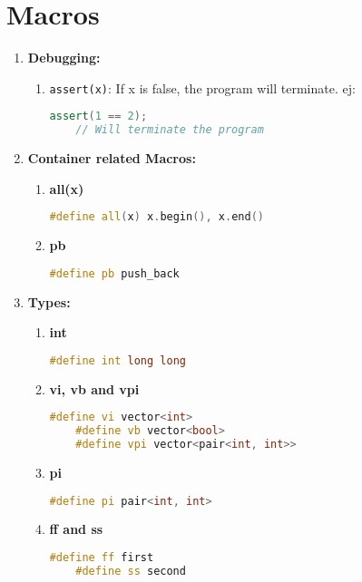 \section{Macros}
\begin{enumerate}
  \item \textbf{Debugging:}
    \begin{enumerate}
      \item \texttt{assert(x)}: If x is false, the program will terminate. ej:
	\begin{lstlisting}[language=C++]
	assert(1 == 2);
	// Will terminate the program
	\end{lstlisting}
    \end{enumerate}
  \item \textbf{Container related Macros:}
    \begin{enumerate}
      \item \textbf{all(x)}
	\begin{lstlisting}[language=C++]
	#define all(x) x.begin(), x.end()
	\end{lstlisting}
      \item \textbf{pb}
	\begin{lstlisting}[language=C++]
	#define pb push_back
	\end{lstlisting}
    \end{enumerate}
  \item \textbf{Types: }
    \begin{enumerate}
      \item \textbf{int}
	\begin{lstlisting}[language=C++]
	#define int long long
	\end{lstlisting}
      \item \textbf{vi, vb and vpi}
	\begin{lstlisting}[language=C++]
	#define vi vector<int>
	#define vb vector<bool>
	#define vpi vector<pair<int, int>>
	\end{lstlisting}
      \item \textbf{pi}
	\begin{lstlisting}[language=C++]
	#define pi pair<int, int>
	\end{lstlisting}
      \item \textbf{ff and ss}
	\begin{lstlisting}[language=C++]
	#define ff first
	#define ss second
	\end{lstlisting}
    \end{enumerate}
\end{enumerate}
